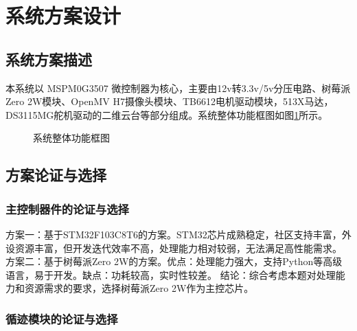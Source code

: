 \documentclass[UTF-8,zihao=-4]{ctexart}
\begin{document}
\newpage
\tableofcontents
\newpage


\section{系统方案设计}
\subsection{系统方案描述}
    本系统以 MSPM0G3507 微控制器为核心，主要由12v转3.3v/5v分压电路、树莓派Zero 2W模块、OpenMV H7摄像头模块、TB6612电机驱动模块，513X马达，DS3115MG舵机驱动的二维云台等部分组成。系统整体功能框图如图\ref{fig:system_block}所示。
    
\begin{figure}[H]
	\centering
	\caption{系统整体功能框图}
	\label{fig:system_block}
\end{figure}

\subsection{方案论证与选择}
\subsubsection{主控制器件的论证与选择}
    方案一：基于STM32F103C8T6的方案。STM32芯片成熟稳定，社区支持丰富，外设资源丰富，但开发迭代效率不高，处理能力相对较弱，无法满足高性能需求。
    方案二：基于树莓派Zero 2W的方案。优点：处理能力强大，支持Python等高级语言，易于开发。缺点：功耗较高，实时性较差。
    结论：综合考虑本题对处理能力和资源需求的要求，选择树莓派Zero 2W作为主控芯片。

\subsubsection{循迹模块的论证与选择}
\end{document}
